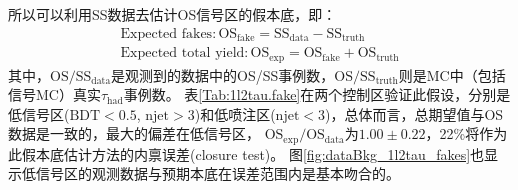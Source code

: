 所以可以利用SS数据去估计OS信号区的假本底，即：
\begin{equation}
 \begin{aligned}
  \text{Expected fakes}: \text{OS}_{\text{fake}}=\text{SS}_{\text{data}}-\text{SS}_{\text{truth}}\\
  \text{Expected total yield}: \text{OS}_{\text{exp}}=\text{OS}_{\text{fake}}+\text{OS}_{\text{truth}}
 \end{aligned}
\end{equation}
其中，$\text{OS}/\text{SS}_{\text{data}}$是观测到的数据中的OS/SS事例数，$\text{OS}/\text{SS}_{\text{truth}}$则是MC中（包括信号MC）真实$\tau_{\text{had}}$事例数。
表\ref{Tab:1l2tau.fake}在两个控制区验证此假设，分别是低信号区($\text{BDT}<0.5$, $\text{njet}>3$)和低喷注区($\text{njet}<3$)，总体而言，总期望值与OS数据是一致的，最大的偏差在低信号区，
$\text{OS}_{\text{exp}}/\text{OS}_{\text{data}}$为$1.00\pm 0.22$，22\%将作为此假本底估计方法的内禀误差(closure test)。
图\ref{fig:dataBkg_1l2tau_fakes}也显示低信号区的观测数据与预期本底在误差范围内是基本吻合的。
\begin{table}[htbp]
\small
\begin{center}
\caption{假$\tau_{\text{had}}$估计方法在低喷注数区和低信号区的closure test。}
\label{Tab:1l2tau.fake}
\end{center}
\end{table}
